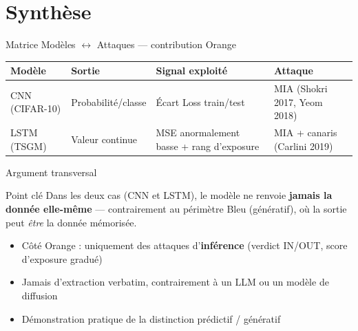 \documentclass[11pt]{beamer}
\begin{document}
\section{Synthèse}

\begin{frame}{Matrice Modèles $\leftrightarrow$ Attaques --- contribution Orange}
  \begin{table}
  \centering
  \scriptsize
  \begin{tabular}{p{2.4cm}p{2.2cm}p{2.6cm}p{2.2cm}}
    \toprule
    \textbf{Modèle} & \textbf{Sortie} & \textbf{Signal exploité} & \textbf{Attaque} \\
    \midrule
    CNN (CIFAR-10) & Probabilité/classe & Écart Loss train/test & MIA (Shokri 2017, Yeom 2018) \\
    LSTM (TSGM) & Valeur continue & MSE anormalement basse + rang d'exposure & MIA + canaris (Carlini 2019) \\
    \bottomrule
  \end{tabular}
  \end{table}
\end{frame}

\begin{frame}{Argument transversal}
  \begin{alertblock}{Point clé}
    Dans les deux cas (CNN et LSTM), le modèle ne renvoie
    \textbf{jamais la donnée elle-même} --- contrairement au
    périmètre Bleu (génératif), où la sortie peut \emph{être}
    la donnée mémorisée.
  \end{alertblock}
  \begin{itemize}
    \item Côté Orange : uniquement des attaques d'\textbf{inférence}
          (verdict IN/OUT, score d'exposure gradué)
    \item Jamais d'extraction verbatim, contrairement à un LLM ou
          un modèle de diffusion
    \item Démonstration pratique de la distinction prédictif / génératif
  \end{itemize}
\end{frame}
\end{document}
